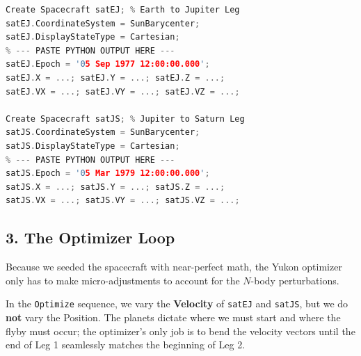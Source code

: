 \documentclass[11pt, letterpaper]{article}
\begin{document}
\begin{lstlisting}[language=C++]
Create Spacecraft satEJ; % Earth to Jupiter Leg
satEJ.CoordinateSystem = SunBarycenter;
satEJ.DisplayStateType = Cartesian;
% --- PASTE PYTHON OUTPUT HERE ---
satEJ.Epoch = '05 Sep 1977 12:00:00.000'; 
satEJ.X = ...; satEJ.Y = ...; satEJ.Z = ...;
satEJ.VX = ...; satEJ.VY = ...; satEJ.VZ = ...;

Create Spacecraft satJS; % Jupiter to Saturn Leg
satJS.CoordinateSystem = SunBarycenter;
satJS.DisplayStateType = Cartesian;
% --- PASTE PYTHON OUTPUT HERE ---
satJS.Epoch = '05 Mar 1979 12:00:00.000';
satJS.X = ...; satJS.Y = ...; satJS.Z = ...;
satJS.VX = ...; satJS.VY = ...; satJS.VZ = ...;
\end{lstlisting}

\subsection*{3. The Optimizer Loop}
Because we seeded the spacecraft with near-perfect math, the Yukon optimizer only has to make micro-adjustments to account for the $N$-body perturbations. 

\begin{tcolorbox}[colback=blue!5!white,colframe=blue!75!black,title=Optimization Tip]
In the \texttt{Optimize} sequence, we vary the \textbf{Velocity} of \texttt{satEJ} and \texttt{satJS}, but we do \textbf{not} vary the Position. The planets dictate where we must start and where the flyby must occur; the optimizer's only job is to bend the velocity vectors until the end of Leg 1 seamlessly matches the beginning of Leg 2.
\end{tcolorbox}
\end{document}
